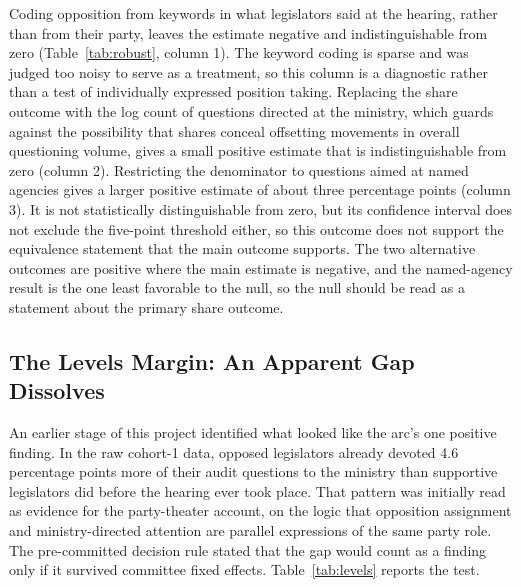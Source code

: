 \documentclass[11pt]{article}
\begin{document}
Coding opposition from keywords in what legislators said at the hearing, rather than from their party, leaves the estimate negative and indistinguishable from zero (Table~\ref{tab:robust}, column 1). The keyword coding is sparse and was judged too noisy to serve as a treatment, so this column is a diagnostic rather than a test of individually expressed position taking. Replacing the share outcome with the log count of questions directed at the ministry, which guards against the possibility that shares conceal offsetting movements in overall questioning volume, gives a small positive estimate that is indistinguishable from zero (column 2). Restricting the denominator to questions aimed at named agencies gives a larger positive estimate of about three percentage points (column 3). It is not statistically distinguishable from zero, but its confidence interval does not exclude the five-point threshold either, so this outcome does not support the equivalence statement that the main outcome supports. The two alternative outcomes are positive where the main estimate is negative, and the named-agency result is the one least favorable to the null, so the null should be read as a statement about the primary share outcome.

\subsection{The Levels Margin: An Apparent Gap Dissolves}

An earlier stage of this project identified what looked like the arc's one positive finding. In the raw cohort-1 data, opposed legislators already devoted 4.6 percentage points more of their audit questions to the ministry than supportive legislators did before the hearing ever took place. That pattern was initially read as evidence for the party-theater account, on the logic that opposition assignment and ministry-directed attention are parallel expressions of the same party role. The pre-committed decision rule stated that the gap would count as a finding only if it survived committee fixed effects. Table~\ref{tab:levels} reports the test.
\end{document}
